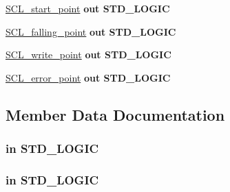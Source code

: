 \begin{DoxyCompactItemize}
\hyperlink{class_s_c_l__detect_a9b4735431fce7fbebae38c31c2a846f1}{S\+C\+L\+\_\+start\+\_\+point}  {\bfseries {\bfseries \textcolor{vhdlchar}{out}\textcolor{vhdlchar}{ }}} {\bfseries \textcolor{vhdlchar}{S\+T\+D\+\_\+\+L\+O\+G\+IC}\textcolor{vhdlchar}{ }} 
\item 
\hyperlink{class_s_c_l__detect_a796eb9e8728ce32e9ece3571c7cca556}{S\+C\+L\+\_\+falling\+\_\+point}  {\bfseries {\bfseries \textcolor{vhdlchar}{out}\textcolor{vhdlchar}{ }}} {\bfseries \textcolor{vhdlchar}{S\+T\+D\+\_\+\+L\+O\+G\+IC}\textcolor{vhdlchar}{ }} 
\item 
\hyperlink{class_s_c_l__detect_a0bc61e9a4356bd0e1f0586906eaaf1c9}{S\+C\+L\+\_\+write\+\_\+point}  {\bfseries {\bfseries \textcolor{vhdlchar}{out}\textcolor{vhdlchar}{ }}} {\bfseries \textcolor{vhdlchar}{S\+T\+D\+\_\+\+L\+O\+G\+IC}\textcolor{vhdlchar}{ }} 
\item 
\hyperlink{class_s_c_l__detect_a9bcf25a91638c856817d54c398e88693}{S\+C\+L\+\_\+error\+\_\+point}  {\bfseries {\bfseries \textcolor{vhdlchar}{out}\textcolor{vhdlchar}{ }}} {\bfseries \textcolor{vhdlchar}{S\+T\+D\+\_\+\+L\+O\+G\+IC}\textcolor{vhdlchar}{ }} 
\end{DoxyCompactItemize}


\subsection{Member Data Documentation}
\subsubsection[{\texorpdfstring{clk}{clk}}]{ {\bfseries \textcolor{vhdlchar}{in}\textcolor{vhdlchar}{ }} {\bfseries \textcolor{vhdlchar}{S\+T\+D\+\_\+\+L\+O\+G\+IC}\textcolor{vhdlchar}{ }} \hspace{0.3cm}{\ttfamily [Port]}}\hypertarget{class_s_c_l__detect_a6231b307b7958b6060563aa2a93d345a}{}\label{class_s_c_l__detect_a6231b307b7958b6060563aa2a93d345a}
\subsubsection[{\texorpdfstring{clk\+\_\+ena}{clk_ena}}]{ {\bfseries \textcolor{vhdlchar}{in}\textcolor{vhdlchar}{ }} {\bfseries \textcolor{vhdlchar}{S\+T\+D\+\_\+\+L\+O\+G\+IC}\textcolor{vhdlchar}{ }} \hspace{0.3cm}{\ttfamily [Port]}}\hypertarget{class_s_c_l__detect_a3313e71ab116de6fc03014f85009a19d}{}\label{class_s_c_l__detect_a3313e71ab116de6fc03014f85009a19d}
